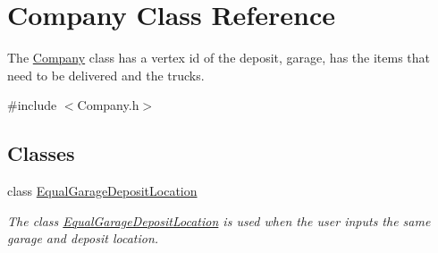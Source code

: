 \hypertarget{class_company}{}\section{Company Class Reference}
\label{class_company}


The \hyperlink{class_company}{Company} class has a vertex id of the deposit, garage, has the items that need to be delivered and the trucks.  




{\ttfamily \#include $<$Company.\+h$>$}

\subsection*{Classes}
\begin{DoxyCompactItemize}
\item 
class \hyperlink{class_company_1_1_equal_garage_deposit_location}{Equal\+Garage\+Deposit\+Location}
\begin{DoxyCompactList}\small\item\em The class \hyperlink{class_company_1_1_equal_garage_deposit_location}{Equal\+Garage\+Deposit\+Location} is used when the user inputs the same garage and deposit location. \end{DoxyCompactList}\end{DoxyCompactItemize}
